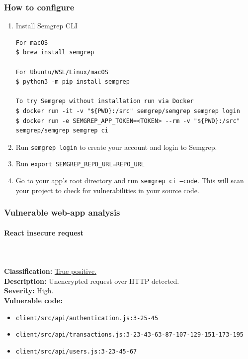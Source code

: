 \documentclass[]{article}
\begin{document}
\subsubsection{How to configure}
 
\begin{enumerate}
\item Install Semgrep CLI
\begin{lstlisting}[numbers=none]
For macOS
$ brew install semgrep

For Ubuntu/WSL/Linux/macOS
$ python3 -m pip install semgrep

To try Semgrep without installation run via Docker
$ docker run -it -v "${PWD}:/src" semgrep/semgrep semgrep login
$ docker run -e SEMGREP_APP_TOKEN=<TOKEN> --rm -v "${PWD}:/src" semgrep/semgrep semgrep ci
\end{lstlisting}
\item Run \texttt{semgrep login} to create your account and login to Semgrep. 
\item Run \texttt{export SEMGREP\_REPO\_URL=REPO\_URL}
\item Go to your app's root directory and run \texttt{semgrep ci --code}. This will scan your project to check for vulnerabilities in your source code.
\end{enumerate}

\subsubsection{Vulnerable web-app analysis}

\paragraph{React insecure request} \mbox{} \\ \\
\textbf{Classification:} \hyperref[subsubsec:cleartext_transmission_of_sensitive_information]{True positive.} \\ 
\textbf{Description:} Unencrypted request over HTTP detected. \\ 
\textbf{Severity:} High. \\ 
\textbf{Vulnerable code:} 
\begin{itemize}
    \item \texttt{client/src/api/authentication.js:3-25-45}
    \item \texttt{client/src/api/transactions.js:3-23-43-63-87-107-129-151-173-195}
    \item \texttt{client/src/api/users.js:3-23-45-67}
\end{itemize}
\end{document}
